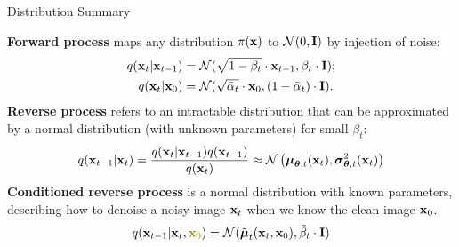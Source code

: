 \documentclass{beamer}
\begin{document}
\begin{frame}{Distribution Summary}

    \textbf{Forward process} maps any distribution $\pi(\mathbf{x})$ to $\mathcal{N}(0, \mathbf{I})$ by injection of noise:
    \begin{align*}
        q(\mathbf{x}_t | \mathbf{x}_{t-1}) &= \mathcal{N}(\sqrt{1 - \beta_t} \cdot \mathbf{x}_{t-1}, \beta_t \cdot \mathbf{I}); \\
        q(\mathbf{x}_t | \mathbf{x}_0) &= \mathcal{N}(\sqrt{\bar{\alpha}_t} \cdot \mathbf{x}_0, (1 - \bar{\alpha}_t) \cdot \mathbf{I}).
    \end{align*}
    \eqpause
    \textbf{Reverse process} refers to an intractable distribution that can be approximated by a normal distribution (with unknown parameters) for small $\beta_t$:
    \[
        q(\mathbf{x}_{t-1}|\mathbf{x}_{t}) = \frac{q(\mathbf{x}_{t}|\mathbf{x}_{t-1}) q(\mathbf{x}_{t-1})}{q(\mathbf{x}_{t})} \approx \mathcal{N} \left(\boldsymbol{\mu}_{\boldsymbol{\theta}, t}(\mathbf{x}_t), \boldsymbol{\sigma}_{\boldsymbol{\theta}, t}^2(\mathbf{x}_t)\right)
    \]
    \eqpause
    \textbf{Conditioned reverse process} is a normal distribution with known parameters, describing how to denoise a noisy image $\mathbf{x}_t$ when we know the clean image $\mathbf{x}_0$.
    \[
        q(\bx_{t-1}|\bx_{t}, {\color{olive}\bx_0}) = \cN(\tilde{\bmu}_t(\bx_t, \bx_0), \tilde{\beta}_t \cdot \bI)
    \]
\end{frame}
\end{document}
